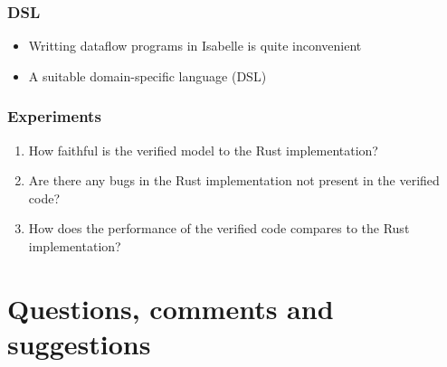 \documentclass[aspectratio=169,10pt]{beamer}
\begin{document}
\begin{frame}
  \frametitle{DSL}
  \begin{itemize}
    \item Writting dataflow programs in Isabelle is quite inconvenient
    \item A suitable domain-specific language (DSL)
  \end{itemize}
\end{frame}

\begin{frame}
  \frametitle{Experiments}
  \begin{enumerate}
    \item How faithful is the verified model to the Rust implementation?
    \item Are there any bugs in the Rust implementation not present in the verified code?
    \item How does the performance of the verified code compares to the Rust implementation?
  \end{enumerate}
\end{frame}

\section{Questions, comments and suggestions}
\end{document}
